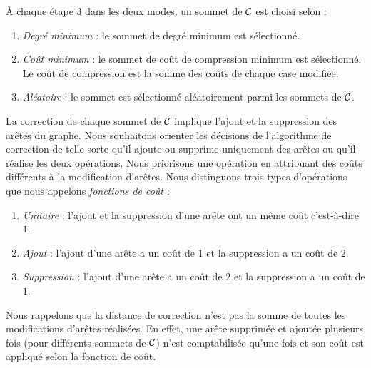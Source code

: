 \`A chaque \'etape $3$ dans les deux modes, un sommet de $\cal C$ est choisi selon :
\begin{enumerate} [label = (\alph*)]
\item {\em Degr\'e minimum} : le sommet de degr\'e minimum est s\'electionn\'e. 
\item {\em Co\^ut minimum} : le sommet de  co\^ut de compression minimum est s\'electionn\'e. Le co\^ut de compression est la somme des co\^uts de chaque case modifi\'ee. 
\item {\em Al\'eatoire} : le sommet est s\'electionn\'e al\'eatoirement parmi les sommets de $\cal C$.
\end{enumerate}
La correction de chaque sommet de ${\cal C}$ implique l'ajout et la suppression des ar\^etes du graphe. Nous souhaitons orienter les d\'ecisions de l'algorithme de correction de telle sorte qu'il ajoute  ou supprime uniquement des ar\^etes ou 
qu'il r\'ealise les deux op\'erations.
 Nous  priorisons une op\'eration en attribuant des co\^uts diff\'erents \`a  la modification d'ar\^etes.
Nous distinguons trois types d'op\'erations que nous appelons {\em fonctions de co\^ut} :
\begin{enumerate}[label=(\roman*)]
\item {\em Unitaire} : l'ajout et la suppression d'une ar\^ete ont un m\^eme co\^ut c'est-\`a-dire $1$.
\item {\em Ajout} : l'ajout d'une ar\^ete a un co\^ut de $1$ et la suppression a un co\^ut de $2$.
\item {\em Suppression} : l'ajout d'une ar\^ete a un co\^ut de $2$ et la suppression a un co\^ut de $1$.
\end{enumerate}
Nous rappelons que la distance de correction n'est pas la somme de toutes les  modifications d'ar\^etes r\'ealis\'ees. En effet, une ar\^ete  supprim\'ee et ajout\'ee plusieurs fois (pour diff\'erents sommets de ${\cal C}$) n'est comptabilis\'ee qu'une fois et son co\^ut est appliqu\'e selon la fonction de co\^ut.
\newline



